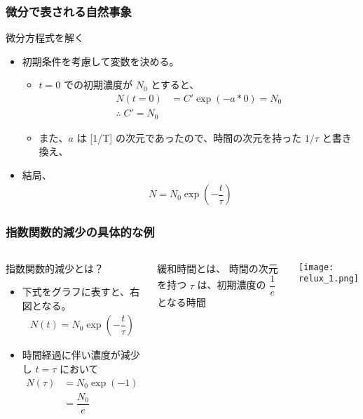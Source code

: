 \documentclass[12pt, dvipdfmx]{beamer}
\begin{document}
\begin{frame}
	\frametitle{微分で表される自然事象}
		\begin{exampleblock}{微分方程式を解く}
			\begin{itemize}
				\item 初期条件を考慮して変数を決める。
				\begin{itemize}
					\item $t=0$ での初期濃度が $N_0$ とすると、
					\small
					\begin{align*}
						N(t=0) &= C' \exp(-a*0) = N_0 \\
						\therefore\; C' = N_0
					\end{align*}
					\normalsize
					\item また、$a$ は [1/T] の次元であったので、時間の次元を持った $1/\tau$ と書き換え、
				\end{itemize}
				\item 結局、
				\small
				\begin{align*}
					N= N_0 \exp \left(-\dfrac{t}{\tau} \right)
				\end{align*}
				\normalsize
			\end{itemize}
		\end{exampleblock}
\end{frame}

\begin{frame}
	\frametitle{指数関数的減少の具体的な例}
		\begin{columns}[T, onlytextwidth]
				\begin{exampleblock}{指数関数的減少とは？}
					\begin{itemize}
						\item 下式をグラフに表すと、右図となる。
						\begin{align*}
							N(t) = N_0 \exp \left(-\dfrac{t}{\tau} \right)
						\end{align*}
						\item 時間経過に伴い濃度が減少し $t = \tau$ において
						\begin{align*}
							N(\tau) 
							&= N_0 \exp(-1)\\ 
							&= \dfrac{N_0}{e}
						\end{align*}
					\end{itemize}
				\end{exampleblock}
				\begin{alertblock}{緩和時間とは、}
					時間の次元を持つ $\tau$ は、初期濃度の $\dfrac{1}{e}$ となる時間
				\end{alertblock}
				\begin{center}
					\texttt{[image: relux\_1.png]}
				\end{center}
		\end{columns}
\end{frame}
\end{document}
